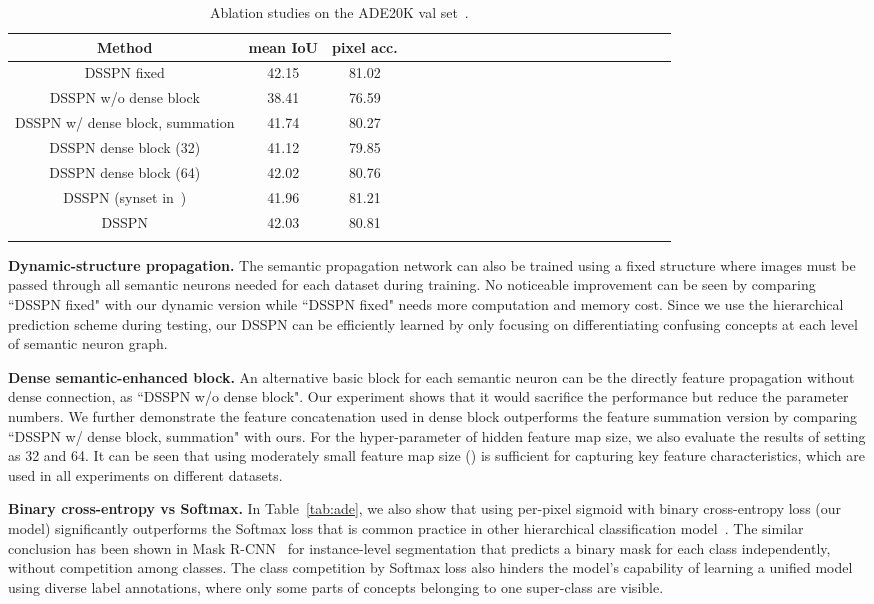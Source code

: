 \documentclass[10pt,twocolumn,letterpaper]{article}
\begin{document}
\begin{table}[!tp]\setlength{\tabcolsep}{2pt}
	\centering\footnotesize{\caption{Ablation studies on the ADE20K val set~\cite{zhou2016semantic}. }\label{tab:ablation}
	\begin{tabular}{cccccccccccccccccccccc}
		\toprule
		{Method} & mean IoU &  pixel acc.\\
		\midrule
		DSSPN fixed & 42.15 & 81.02 \\
		DSSPN w/o dense block & 38.41 & 76.59\\
		DSSPN w/ dense block, summation & 41.74 & 80.27\\
		DSSPN dense block (32) & 41.12 & 79.85\\
		DSSPN dense block (64) & 42.02 & 80.76\\
		DSSPN (synset in~\cite{zhou2016semantic}) & 41.96 & 81.21\\
		\midrule
		{DSSPN} & {42.03} & {80.81}\\
		\hline
				\vspace{-5mm}
	\end{tabular}}
\end{table}

\textbf{Dynamic-structure propagation.} The semantic propagation network can also be trained using a fixed structure where images must be passed through all semantic neurons needed for each dataset during training. No noticeable improvement can be seen by comparing ``DSSPN fixed" with our dynamic version while  ``DSSPN fixed" needs more computation  and memory cost. Since we use the hierarchical prediction scheme during testing, our DSSPN can be efficiently learned by only focusing on differentiating confusing concepts at each level of semantic neuron graph.

\textbf{Dense semantic-enhanced block.} An alternative basic block for each semantic neuron can be the directly feature propagation without dense connection, as ``DSSPN w/o dense block". Our experiment shows that it would sacrifice the performance but reduce the parameter numbers. We further demonstrate the feature concatenation used in dense block outperforms the feature summation version by comparing ``DSSPN w/ dense block, summation" with ours. For the hyper-parameter  of hidden feature map size, we also evaluate the results of setting  as 32 and 64. It can be seen that using moderately small feature map size () is sufficient for capturing key feature characteristics, which are used in all experiments on different datasets.


\textbf{Binary cross-entropy vs Softmax.} In Table~\ref{tab:ade}, we also show that using per-pixel sigmoid with binary cross-entropy loss (our model) significantly outperforms the Softmax loss that is common practice in other hierarchical classification model~\cite{redmon2016yolo9000}. The similar conclusion has been shown in Mask R-CNN~\cite{he2017mask} for instance-level segmentation that predicts a binary mask for each class independently, without competition among classes. The class competition by Softmax loss also hinders the model's capability of learning a unified model using diverse label annotations, where only some parts of concepts belonging to one super-class are visible. 
\end{document}
